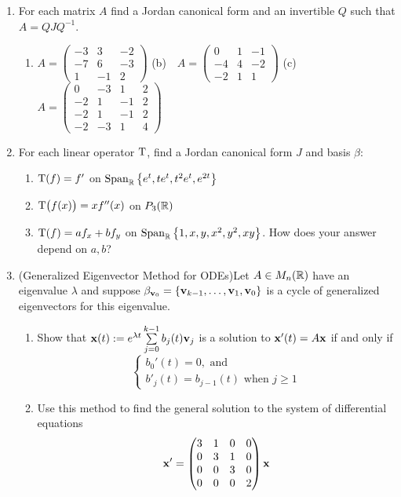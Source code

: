 \begin{exercises}
\begin{enumerate}
	  
		\item For each matrix $A$ find a Jordan canonical form and an invertible $Q$ such that $A=QJQ^{-1}$.
		\begin{enumerate}
		  \item $A=\begin{pmatrix}
		  -3 & 3 & -2\\
			-7 & 6 & -3\\
			1 & -1 & 2
		  \end{pmatrix}$\qquad
		  (b)\ \ $A=\begin{pmatrix}
		  0 & 1 & -1\\
			-4 & 4 & -2\\
			-2 & 1 & 1
		  \end{pmatrix}$\qquad
		  (c)\ \ $A=\begin{pmatrix}
		  0 & -3 & 1 & 2\\
			-2 & 1 & -1 & 2\\
			-2 & 1 & -1 & 2\\
			-2 & -3 & 1 & 4
		  \end{pmatrix}$
		\end{enumerate}
	
	
		\item For each linear operator $\mathrm{T}$, find a Jordan canonical form $J$ and basis $\beta$:
		\begin{enumerate}
		  \item $\mathrm{T}(f)=f'$ on $\operatorname{Span}_{\mathbb{R}}\big\{e^t,te^t,t^2e^{t},e^{2t}\big\}$
		  
		  \item $\mathrm{T}\bigl(f(x)\bigr)=xf''(x)$ on $P_3(\mathbb{R})$
		  
		  \item $\mathrm{T}(f)=af_x+bf_y$ on $\operatorname{Span}_{\mathbb{R}}\big\{1,x,y,x^2,y^2,xy\big\}$. How does your answer depend on $a,b$?
		\end{enumerate}
		
		
		\item (Generalized Eigenvector Method for ODEs)\quad Let $A\in M_n(\mathbb{R})$ have an eigenvalue $\lambda$ and suppose $\beta_{{\mathbf{v}}_0}=\{{\mathbf{v}}_{k-1},\ldots,{\mathbf{v}}_1,{\mathbf{v}}_0\}$ is a cycle of generalized eigenvectors for this eigenvalue.
		\begin{enumerate}
		  \item Show that ${\mathbf{x}}(t):=e^{\lambda t}\sum\limits_{j=0}^{k-1}b_j(t){\mathbf{v}}_j$ is a solution to ${\mathbf{x}}'(t)=A{\mathbf{x}}$ if and only if
			\[
				\begin{cases}
					b_0'(t)=0,\text{ and}\\
					b'_j(t)=b_{j-1}(t)\text{ when $j\ge 1$}
				\end{cases}
			\]
			\item Use this method to find the general solution to the system of differential equations
			\[
				{\mathbf{x}}'=\begin{pmatrix}
					3&1&0&0\\
					0&3&1&0\\
					0&0&3&0\\
					0&0&0&2
				\end{pmatrix}
				{\mathbf{x}}
			\]
		\end{enumerate}
	\end{enumerate}
\end{exercises}
